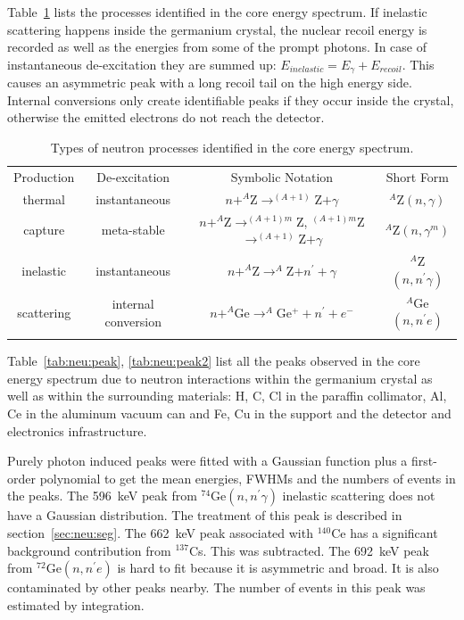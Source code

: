 Table~\ref{tab:neu:type} lists the processes identified in the core
energy spectrum. If inelastic scattering happens inside the germanium
crystal, the nuclear recoil energy is recorded as well as the energies
from some of the prompt photons. In case of instantaneous
de-excitation they are summed up: $E_{inelastic} = E_{\gamma} +
E_{recoil}$. This causes an asymmetric peak with a long recoil tail on
the high energy side. Internal conversions only create identifiable
peaks if they occur inside the crystal, otherwise the emitted
electrons do not reach the detector.

\begin{table}[tbhp]
  \caption{Types of neutron processes identified in the core energy
    spectrum.}
  \label{tab:neu:type}\centering
  \begin{tabular*}{\textwidth}{@{\extracolsep{\fill}}cccc}
    \hline\noalign{\smallskip}
    Production & De-excitation & Symbolic Notation & Short Form \\
    \noalign{\smallskip}\hline\noalign{\smallskip}
    thermal & instantaneous & $n + ^A$Z$ \rightarrow ^{(A+1)}$Z$ +
\gamma$ & $^A$Z$(n,\gamma)$\\
    \noalign{\smallskip}\cline{2-4}\noalign{\smallskip}
    capture & meta-stable 
    & $n + ^A$Z$ \rightarrow ^{(A+1)m}$Z, $^{(A+1)m}$Z$ \rightarrow
^{(A+1)}$Z$+\gamma$ & $^A$Z$(n,\gamma^{m})$\\
    \noalign{\smallskip}\hline\noalign{\smallskip}
    inelastic & instantaneous & 
    $n + ^A$Z$ \rightarrow ^A$Z$ + n^\prime + \gamma$ &
$^A$Z$(n,n^\prime\gamma)$\\
    \noalign{\smallskip}\cline{2-4}\noalign{\smallskip}
    scattering & internal conversion & 
    $n + ^A$Ge$ \rightarrow ^A$Ge$^{+} + n^\prime + e^-$ &
$^A$Ge$(n,n^\prime e)$\\
    \noalign{\smallskip}\hline
  \end{tabular*}
\end{table}

Table~\ref{tab:neu:peak}, \ref{tab:neu:peak2} list all the peaks
observed in the core energy spectrum due to neutron interactions
within the germanium crystal as well as within the surrounding
materials: H, C, Cl in the paraffin collimator, Al, Ce in the aluminum
vacuum can and Fe, Cu in the support and the detector and electronics
infrastructure.

Purely photon induced peaks were fitted with a Gaussian function plus
a first-order polynomial to get the mean energies, FWHMs and the
numbers of events in the peaks. The 596~keV peak from $^{74}$Ge$(n,
n^\prime \gamma)$ inelastic scattering does not have a Gaussian
distribution. The treatment of this peak is described in
section~\ref{sec:neu:seg}. The 662~keV peak associated with $^{140}$Ce
has a significant background contribution from $^{137}$Cs. This was
subtracted. The 692~keV peak from $^{72}$Ge$(n,n^\prime e)$ is hard to
fit because it is asymmetric and broad. It is also contaminated by
other peaks nearby. The number of events in this peak was estimated by
integration.

